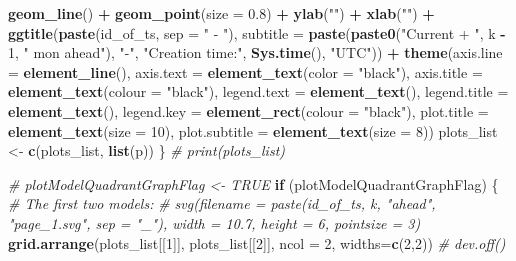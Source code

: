 \documentclass[
]{article}
\newenvironment{Shaded}{\begin{snugshade}}{\end{snugshade}}
\newcommand{\AttributeTok}[1]{\textcolor[rgb]{0.13,0.29,0.53}{#1}}
\newcommand{\CommentTok}[1]{\textcolor[rgb]{0.56,0.35,0.01}{\textit{#1}}}
\newcommand{\ControlFlowTok}[1]{\textcolor[rgb]{0.13,0.29,0.53}{\textbf{#1}}}
\newcommand{\DecValTok}[1]{\textcolor[rgb]{0.00,0.00,0.81}{#1}}
\newcommand{\FloatTok}[1]{\textcolor[rgb]{0.00,0.00,0.81}{#1}}
\newcommand{\FunctionTok}[1]{\textcolor[rgb]{0.13,0.29,0.53}{\textbf{#1}}}
\newcommand{\NormalTok}[1]{#1}
\newcommand{\OtherTok}[1]{\textcolor[rgb]{0.56,0.35,0.01}{#1}}
\newcommand{\SpecialCharTok}[1]{\textcolor[rgb]{0.81,0.36,0.00}{\textbf{#1}}}
\newcommand{\StringTok}[1]{\textcolor[rgb]{0.31,0.60,0.02}{#1}}
\begin{document}
\begin{Shaded}
\begin{Highlighting}[]
        \FunctionTok{geom\_line}\NormalTok{() }\SpecialCharTok{+}
        \FunctionTok{geom\_point}\NormalTok{(}\AttributeTok{size =} \FloatTok{0.8}\NormalTok{) }\SpecialCharTok{+}
        \FunctionTok{ylab}\NormalTok{(}\StringTok{""}\NormalTok{) }\SpecialCharTok{+}
        \FunctionTok{xlab}\NormalTok{(}\StringTok{""}\NormalTok{) }\SpecialCharTok{+}
        \FunctionTok{ggtitle}\NormalTok{(}\FunctionTok{paste}\NormalTok{(id\_of\_ts, }\AttributeTok{sep =} \StringTok{" {-} "}\NormalTok{), }\AttributeTok{subtitle =} \FunctionTok{paste}\NormalTok{(}\FunctionTok{paste0}\NormalTok{(}\StringTok{"Current + "}\NormalTok{, k }\SpecialCharTok{{-}} \DecValTok{1}\NormalTok{, }\StringTok{" mon ahead"}\NormalTok{), }\StringTok{"{-}"}\NormalTok{, }\StringTok{"Creation time:"}\NormalTok{, }\FunctionTok{Sys.time}\NormalTok{(), }\StringTok{"UTC"}\NormalTok{)) }\SpecialCharTok{+}
        \FunctionTok{theme}\NormalTok{(}\AttributeTok{axis.line =} \FunctionTok{element\_line}\NormalTok{(), }\AttributeTok{axis.text =} \FunctionTok{element\_text}\NormalTok{(}\AttributeTok{color =} \StringTok{"black"}\NormalTok{), }\AttributeTok{axis.title =} \FunctionTok{element\_text}\NormalTok{(}\AttributeTok{colour =} \StringTok{"black"}\NormalTok{), }\AttributeTok{legend.text =} \FunctionTok{element\_text}\NormalTok{(), }\AttributeTok{legend.title =} \FunctionTok{element\_text}\NormalTok{(), }\AttributeTok{legend.key =} \FunctionTok{element\_rect}\NormalTok{(}\AttributeTok{colour =} \StringTok{"black"}\NormalTok{), }\AttributeTok{plot.title =} \FunctionTok{element\_text}\NormalTok{(}\AttributeTok{size =} \DecValTok{10}\NormalTok{), }\AttributeTok{plot.subtitle =} \FunctionTok{element\_text}\NormalTok{(}\AttributeTok{size =} \DecValTok{8}\NormalTok{))}
\NormalTok{      plots\_list }\OtherTok{\textless{}{-}} \FunctionTok{c}\NormalTok{(plots\_list, }\FunctionTok{list}\NormalTok{(p))}
\NormalTok{    \}}
    \CommentTok{\# print(plots\_list)}

    \CommentTok{\# plotModelQuadrantGraphFlag \textless{}{-} TRUE}
    \ControlFlowTok{if}\NormalTok{ (plotModelQuadrantGraphFlag) \{}
      \CommentTok{\# The first two models:}
      \CommentTok{\# svg(filename = paste(id\_of\_ts, k, "ahead", "page\_1.svg", sep = "\_"), width = 10.7, height = 6, pointsize = 3)}
      \FunctionTok{grid.arrange}\NormalTok{(plots\_list[[}\DecValTok{1}\NormalTok{]], plots\_list[[}\DecValTok{2}\NormalTok{]], }\AttributeTok{ncol =} \DecValTok{2}\NormalTok{, }\AttributeTok{widths=}\FunctionTok{c}\NormalTok{(}\DecValTok{2}\NormalTok{,}\DecValTok{2}\NormalTok{))}
      \CommentTok{\# dev.off()}


\end{Highlighting}
\end{Shaded}
\end{document}
